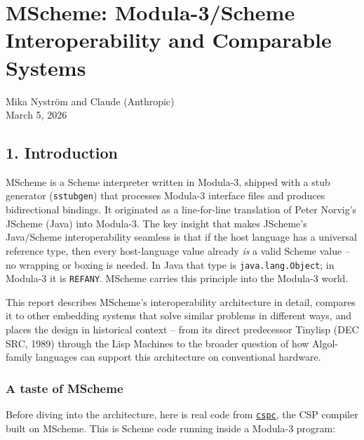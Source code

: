 \documentclass[
  12pt,
]{report}
\author{}
\date{}
\newcommand{\passthrough}[1]{#1}
\begin{document}
\chapter{MScheme: Modula-3/Scheme Interoperability and Comparable
Systems}\label{mscheme-modula-3scheme-interoperability-and-comparable-systems}

Mika Nyström and Claude (Anthropic)\\
March 5, 2026

\section{1. Introduction}\label{introduction}

MScheme is a Scheme interpreter written in Modula-3, shipped with a stub
generator (\passthrough{\lstinline!sstubgen!}) that processes Modula-3
interface files and produces bidirectional bindings. It originated as a
line-for-line translation of Peter Norvig's JScheme (Java) into
Modula-3. The key insight that makes JScheme's Java/Scheme
interoperability seamless is that if the host language has a universal
reference type, then every host-language value already \emph{is} a valid
Scheme value -- no wrapping or boxing is needed. In Java that type is
\passthrough{\lstinline!java.lang.Object!}; in Modula-3 it is
\passthrough{\lstinline!REFANY!}. MScheme carries this principle into
the Modula-3 world.

This report describes MScheme's interoperability architecture in detail,
compares it to other embedding systems that solve similar problems in
different ways, and places the design in historical context -- from its
direct predecessor Tinylisp (DEC SRC, 1989) through the Lisp Machines to
the broader question of how Algol-family languages can support this
architecture on conventional hardware.

\subsection{A taste of MScheme}\label{a-taste-of-mscheme}

Before diving into the architecture, here is real code from
\href{https://github.com/IntelLabs/async-toolkit/tree/main/m3utils/m3utils/csp}{\passthrough{\lstinline!cspc!}},
the CSP compiler built on MScheme. This is Scheme code running inside a
Modula-3 program:
\end{document}
